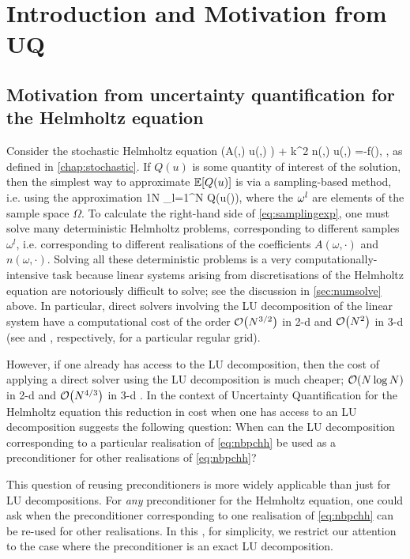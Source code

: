 \section{Introduction and Motivation from UQ}\label{sec:intronbpc}

\subsection{Motivation from uncertainty quantification for the Helmholtz equation} 
Consider the stochastic Helmholtz equation 
\beq\label{eq:nbpchh}
\nabla\cdot\big(A(\omega,\bx) \nabla u(\omega,\bx) \big) + k^2 n(\omega,\bx) u(\omega,\bx) =-f(\bx), \quad \bx\in\Dp,
\eeq
as defined in \cref{chap:stochastic}. If $Q(u)$ is some quantity of interest of the solution, then the simplest way to approximate $\EXP{Q(u)}$ is via a sampling-based method, i.e. using the approximation
\beq\label{eq:samplingexp}
 \approx \frac1N \sum_{l=1}^N Q(u(\omegasl)),
\eeq
where the $\omega^{l}$ are elements of the sample space $\Omega.$ To calculate the right-hand side of \cref{eq:samplingexp},  one must solve many deterministic Helmholtz problems, corresponding to different samples $\omega^l$, i.e. corresponding to different realisations of the coefficients $A(\omega,\cdot)$ and $n(\omega,\cdot)$.
Solving all these deterministic problems is a very computationally-intensive task because linear systems arising from discretisations of the Helmholtz equation are notoriously difficult to solve; see the discussion in \cref{sec:numsolve} above. In particular, direct solvers involving the LU decomposition of the linear system have a computational cost of the order $\cO\mleft(N^{3/2}\mright)$ in 2-d  and $\cO\mleft(N^2\mright)$ in 3-d (see \cite[Section 1]{DuErRe:76} and \cite[Equation 3]{DuErRe:76}, respectively, for a particular regular grid).

However, if one already has access to the LU decomposition, then the cost of applying a direct solver using the LU decomposition is much cheaper; $\cO\mleft(N\log N\mright)$ in 2-d \cite[Section 1]{DuErRe:76} and $\cO\mleft(N^{4/3}\mright)$ in 3-d \cite[Equation 4]{DuErRe:76}. In the context of Uncertainty Quantification for the Helmholtz equation this reduction in cost when one has access to an LU decomposition suggests the following question: When can the LU decomposition corresponding to a particular realisation of \cref{eq:nbpchh} be used as a preconditioner for other realisations of \cref{eq:nbpchh}?

This question of reusing preconditioners is more widely applicable than just for LU decompositions. For \emph{any} preconditioner for the Helmholtz equation, one could ask when the preconditioner corresponding to one realisation of \cref{eq:nbpchh} can be re-used for other realisations. In this , for simplicity, we restrict our attention to the case where the preconditioner is an exact LU decomposition.

